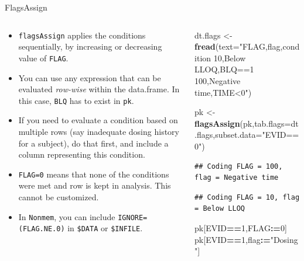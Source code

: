 \documentclass[
  8pt,
  ignorenonframetext,
  aspectratio=169]{beamer}
\newenvironment{Shaded}{\begin{snugshade}}{\end{snugshade}}
\newcommand{\DataTypeTok}[1]{\textcolor[rgb]{0.13,0.29,0.53}{#1}}
\newcommand{\DecValTok}[1]{\textcolor[rgb]{0.00,0.00,0.81}{#1}}
\newcommand{\ErrorTok}[1]{\textcolor[rgb]{0.64,0.00,0.00}{\textbf{#1}}}
\newcommand{\KeywordTok}[1]{\textcolor[rgb]{0.13,0.29,0.53}{\textbf{#1}}}
\newcommand{\NormalTok}[1]{#1}
\newcommand{\OperatorTok}[1]{\textcolor[rgb]{0.81,0.36,0.00}{\textbf{#1}}}
\newcommand{\StringTok}[1]{\textcolor[rgb]{0.31,0.60,0.02}{#1}}
\providecommand{\tightlist}{%
  \setlength{\itemsep}{0pt}\setlength{\parskip}{0pt}}
\begin{document}
\begin{frame}[fragile]{FlagsAssign}
\protect\hypertarget{flagsassign}{}
\begin{columns}[T]
\begin{column}{0.48\textwidth}
\begin{itemize}
\tightlist
\item
  \texttt{flagsAssign} applies the conditions sequentially, by
  increasing or decreasing value of \texttt{FLAG}.
\item
  You can use any expression that can be evaluated \emph{row-wise}
  within the data.frame. In this case, \texttt{BLQ} has to exist in
  \texttt{pk}.
\item
  If you need to evaluate a condition based on multiple rows (say
  inadequate dosing history for a subject), do that first, and include a
  column representing this condition.
\item
  \texttt{FLAG=0} means that none of the conditions were met and row is
  kept in analysis. This cannot be customized.
\item
  In \texttt{Nonmem}, you can include \texttt{IGNORE=(FLAG.NE.0)} in
  \texttt{\$DATA} or \texttt{\$INFILE}.
\end{itemize}
\end{column}

\begin{column}{0.48\textwidth}
\footnotesize

\begin{Shaded}
\begin{Highlighting}[]
\NormalTok{dt.flags \textless{}{-}}\StringTok{ }\KeywordTok{fread}\NormalTok{(}\DataTypeTok{text=}\StringTok{"FLAG,flag,condition}
\StringTok{10,Below LLOQ,BLQ==1}
\StringTok{100,Negative time,TIME\textless{}0"}\NormalTok{)}

\NormalTok{pk \textless{}{-}}\StringTok{ }\KeywordTok{flagsAssign}\NormalTok{(pk,}\DataTypeTok{tab.flags=}\NormalTok{dt.flags,}\DataTypeTok{subset.data=}\StringTok{"EVID==0"}\NormalTok{)}
\end{Highlighting}
\end{Shaded}

\begin{verbatim}
## Coding FLAG = 100, flag = Negative time
\end{verbatim}

\begin{verbatim}
## Coding FLAG = 10, flag = Below LLOQ
\end{verbatim}

\begin{Shaded}
\begin{Highlighting}[]
\NormalTok{pk[EVID}\OperatorTok{==}\DecValTok{1}\NormalTok{,FLAG}\OperatorTok{:}\ErrorTok{=}\DecValTok{0}\NormalTok{]}
\NormalTok{pk[EVID}\OperatorTok{==}\DecValTok{1}\NormalTok{,flag}\OperatorTok{:}\ErrorTok{=}\StringTok{"Dosing"}\NormalTok{]}
\end{Highlighting}
\end{Shaded}
\end{column}
\end{columns}
\end{frame}
\end{document}
